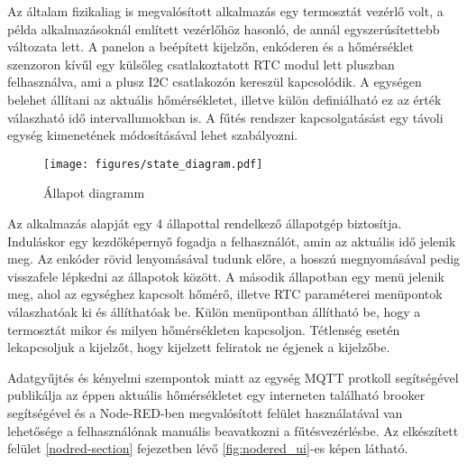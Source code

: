 Az általam fizikaliag is megvalósított alkalmazás egy termosztát vezérlő volt, a példa alkalmazásoknál említett vezérlőhöz hasonló, de annál egyszerúsítettebb változata lett. A panelon a beépített kijelzőn, enkóderen és a hőmérséklet szenzoron kívűl egy külsőleg csatlakoztatott RTC modul lett pluszban felhasználva, ami a plusz I2C csatlakozón kereszül kapcsolódik. A egységen belehet állítani az aktuális hőmérsékletet, illetve külön definiálható ez az érték válaszható idő intervallumokban is. A fűtés rendszer kapcsolgatásást egy távoli egység kimenetének módosításával lehet szabályozni.

\begin{figure}[!ht]
    \centering
    \texttt{[image: figures/state\_diagram.pdf]}
    \caption{Állapot diagramm}
    \label{fig:state_machine}
\end{figure}

Az alkalmazás alapját egy 4 állapottal rendelkező állapotgép biztosítja. Induláskor egy kezdőképernyő fogadja a felhasználót, amin az aktuális idő jelenik meg. Az enkóder rövid lenyomásával tudunk előre, a hosszú megnyomásával pedig visszafele lépkedni az állapotok között. A második állapotban egy menü jelenik meg, ahol az egységhez kapcsolt hőmérő, illetve RTC paraméterei menüpontok válaszhatóak ki és állíthatóak be. Külön menüpontban állítható be, hogy a termosztát mikor és milyen hőmérsékleten kapcsoljon. Tétlenség esetén lekapcsoljuk a kijelzőt, hogy kijelzett feliratok ne égjenek a kijelzőbe.

Adatgyűjtés és kényelmi szempontok miatt az egység MQTT protkoll segítségével publikálja az éppen aktuális hőmérsékletet egy interneten található brooker segítségével és a Node-RED-ben megvalósított felület használatával van lehetősége a felhasználónak manuális beavatkozni a fűtésvezérlésbe. Az elkészített felület \ref{nodred-section} fejezetben lévő \ref{fig:nodered_ui}-es képen látható.